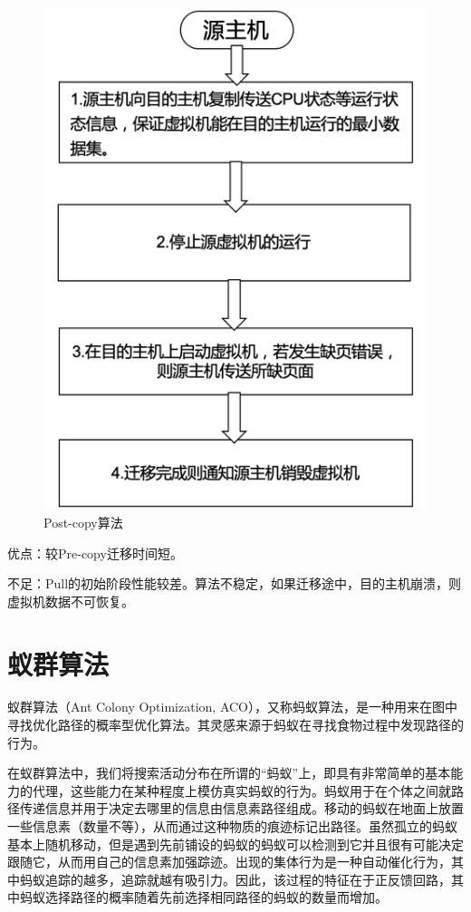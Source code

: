 \begin{figure}[htb]
  \centering
  \includegraphics{./Figure/IMG_Chap2_5.png}
  \caption{Post-copy算法}\label{Fig:chap2_5}
\end{figure}

优点：较Pre-copy迁移时间短。

不足：Pull的初始阶段性能较差。算法不稳定，如果迁移途中，目的主机崩溃，则虚拟机数据不可恢复。

\section{蚁群算法}
蚁群算法（Ant Colony Optimization, ACO），又称蚂蚁算法，是一种用来在图中寻找优化路径的概率型优化算法。其灵感来源于蚂蚁在寻找食物过程中发现路径的行为\cite{Maniezzo}。

在蚁群算法中，我们将搜索活动分布在所谓的“蚂蚁”上，即具有非常简单的基本能力的代理，这些能力在某种程度上模仿真实蚂蚁的行为。蚂蚁用于在个体之间就路径传递信息并用于决定去哪里的信息由信息素路径组成。移动的蚂蚁在地面上放置一些信息素（数量不等），从而通过这种物质的痕迹标记出路径。虽然孤立的蚂蚁基本上随机移动，但是遇到先前铺设的蚂蚁的蚂蚁可以检测到它并且很有可能决定跟随它，从而用自己的信息素加强踪迹。出现的集体行为是一种自动催化行为，其中蚂蚁追踪的越多，追踪就越有吸引力。因此，该过程的特征在于正反馈回路，其中蚂蚁选择路径的概率随着先前选择相同路径的蚂蚁的数量而增加。

